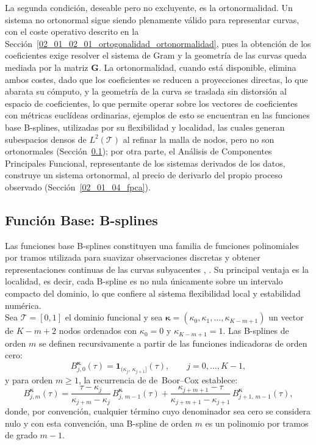 La segunda condición, deseable pero no excluyente, es la ortonormalidad. Un sistema no ortonormal sigue siendo plenamente válido para representar curvas, con el coste operativo descrito en la Sección~\ref{02_01_02_01_ortogonalidad_ortonormalidad}, pues la obtención de los coeficientes exige resolver el sistema de Gram y la geometría de las curvas queda mediada por la matriz $\mathbf{G}$. La ortonormalidad, cuando está disponible, elimina ambos costes, dado que los coeficientes se reducen a proyecciones directas, lo que abarata su cómputo, y la geometría de la curva se traslada sin distorsión al espacio de coeficientes, lo que permite operar sobre los vectores de coeficientes con métricas euclídeas ordinarias, ejemplos de esto se encuentran en las funciones base  B-splines, utilizadas por su flexibilidad y localidad, las cuales generan subespacios densos de $L^2(\mathcal{T})$ al refinar la malla de nodos, pero no son ortonormales (Sección~\ref{02_01_03_bsplines}); por otra parte, el Análisis de Componentes Principales Funcional, representante de los sistemas derivados de los datos, construye un sistema ortonormal, al precio de derivarlo del propio proceso observado (Sección~\ref{02_01_04_fpca}). 


\subsection{Función Base: B-splines}
\label{02_01_03_bsplines}
Las funciones base B-splines constituyen una familia de funciones polinomiales por tramos utilizada para suavizar observaciones discretas y obtener representaciones continuas de las curvas subyacentes , \cite{02_01_ramsay2006functional}. Su principal ventaja es la localidad, es decir, cada B-spline es no nula únicamente sobre un intervalo compacto del dominio, lo que confiere al sistema flexibilidad local y estabilidad numérica.\\

Sea $\mathcal{T} = [0,1]$ el dominio funcional y sea $\boldsymbol{\kappa} = (\kappa_0, \kappa_1, \dots, \kappa_{K-m+1})$ un vector de $K-m+2$ nodos ordenados con $\kappa_0 = 0$ y $\kappa_{K-m+1} = 1$. Las B-splines de orden $m$ se definen recursivamente a partir de las funciones indicadoras de orden cero:
\begin{equation}
    B_{j,0}^{\boldsymbol{\kappa}}(\tau) =
    \mathbf{1}_{(\kappa_j,\,\kappa_{j+1}]}(\tau),
    \qquad j = 0, \dots, K-1,
\end{equation}
y para orden $m \geq 1$, la recurrencia de de~Boor--Cox establece:
\begin{equation}
    B_{j,m}^{\boldsymbol{\kappa}}(\tau) =
    \frac{\tau - \kappa_j}{\kappa_{j+m} - \kappa_j}\,
    B_{j,\,m-1}^{\boldsymbol{\kappa}}(\tau)
    +
    \frac{\kappa_{j+m+1} - \tau}{\kappa_{j+m+1} - \kappa_{j+1}}\,
    B_{j+1,\,m-1}^{\boldsymbol{\kappa}}(\tau),
\end{equation}
donde, por convención, cualquier término cuyo denominador sea cero se considera nulo y con esta convención, una B-spline de orden $m$ es un polinomio por tramos de grado $m-1$.\\

